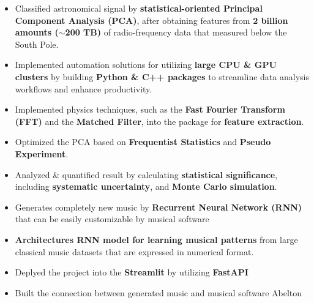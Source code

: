 \documentclass[10pt,a4paper,ragged2e,withhyper]{altacv}
\begin{document}
\begin{paracol}{2}

\begin{itemize}
\item Classified astronomical signal by {\bf statistical-oriented Principal Component Analysis (PCA)}, after obtaining features from {\bf 2 billion amounts (${\sim}$200 TB)} of radio-frequency data that measured below the South Pole.
\item Implemented automation solutions for utilizing {\bf large CPU \& GPU clusters} by building {\bf Python \& C++ packages} to streamline data analysis workflows and enhance productivity.
\item Implemented physics techniques, such as the {\bf Fast Fourier Transform (FFT)} and the {\bf Matched Filter}, into the package for {\bf feature extraction}.
\item Optimized the PCA based on {\bf Frequentist Statistics} and {\bf Pseudo Experiment}.
\item Analyzed \& quantified result by calculating {\bf statistical significance}, including {\bf systematic uncertainty}, and {\bf Monte Carlo simulation}.

\end{itemize}

\divider

\begin{itemize}
\item Generates completely new music by {\bf Recurrent Neural Network (RNN)} that can be easily customizable by musical software
\item {\bf Architectures RNN model for learning musical patterns} from large classical music datasets that are expressed in numerical format. 
\item Deplyed the project into the {\bf Streamlit} by utilizing {\bf FastAPI}
\item Built the connection between generated music and musical software Abelton
\end{itemize}


\end{paracol}
\end{document}
